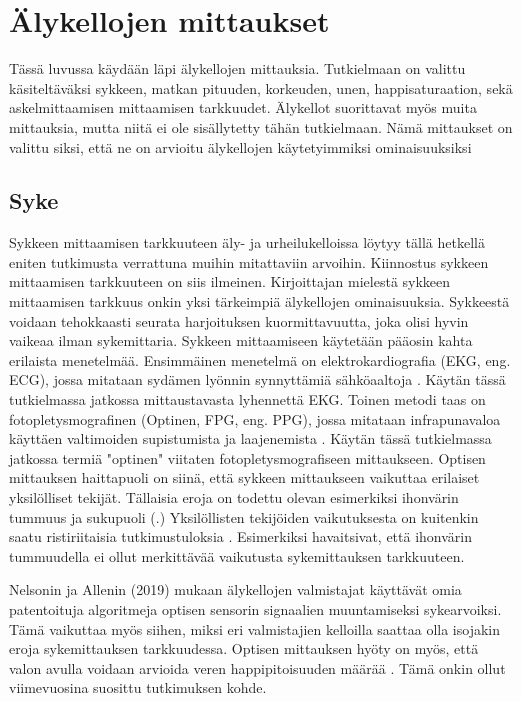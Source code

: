 \documentclass[utf8,bachelor,finnish]{bachelor}
\begin{document}
  \chapter{Älykellojen mittaukset}
  Tässä luvussa käydään läpi älykellojen mittauksia. Tutkielmaan on valittu käsiteltäväksi sykkeen, matkan pituuden, korkeuden, unen, happisaturaation, sekä askelmittaamisen mittaamisen tarkkuudet.
   Älykellot suorittavat myös muita mittauksia, mutta niitä ei ole sisällytetty tähän tutkielmaan. Nämä mittaukset on valittu siksi, että ne on arvioitu
    älykellojen käytetyimmiksi ominaisuuksiksi\\


  \section{Syke}
  Sykkeen mittaamisen tarkkuuteen äly- ja urheilukelloissa löytyy tällä hetkellä eniten tutkimusta verrattuna muihin mitattaviin arvoihin.
   Kiinnostus sykkeen mittaamisen tarkkuuteen on siis ilmeinen. Kirjoittajan mielestä sykkeen mittaamisen tarkkuus onkin yksi tärkeimpiä älykellojen ominaisuuksia.
    Sykkeestä voidaan tehokkaasti seurata harjoituksen kuormittavuutta, joka olisi hyvin vaikeaa ilman sykemittaria.
   Sykkeen mittaamiseen käytetään pääosin kahta erilaista menetelmää. Ensimmäinen menetelmä on elektrokardiografia (EKG, eng. ECG), jossa mitataan sydämen lyönnin
   synnyttämiä sähköaaltoja \parencite{noauthor_heart_nodate}. Käytän tässä tutkielmassa jatkossa mittaustavasta lyhennettä EKG.
    Toinen metodi taas on fotopletysmografinen (Optinen, FPG, eng. PPG), jossa mitataan infrapunavaloa käyttäen valtimoiden supistumista ja laajenemista \parencite{noauthor_heart_nodate}.
      Käytän tässä tutkielmassa jatkossa termiä "optinen" viitaten fotopletysmografiseen
      mittaukseen. Optisen mittauksen haittapuoli on siinä, että sykkeen mittaukseen vaikuttaa erilaiset yksilölliset tekijät.
       Tällaisia eroja on todettu olevan esimerkiksi ihonvärin tummuus ja sukupuoli (\cite{shcherbina_accuracy_2017,hochstadt_continuous_2020}.)
       Yksilöllisten tekijöiden vaikutuksesta on kuitenkin saatu ristiriitaisia tutkimustuloksia \parencite{pasadyn_accuracy_2019}.
        Esimerkiksi \textcite{sanudo_pilot_2019, bent_investigating_2020} havaitsivat, että ihonvärin tummuudella ei ollut merkittävää vaikutusta sykemittauksen tarkkuuteen.
      
      
      Nelsonin ja Allenin (2019) mukaan älykellojen valmistajat käyttävät omia patentoituja algoritmeja optisen sensorin
       signaalien muuntamiseksi sykearvoiksi. Tämä vaikuttaa myös siihen, miksi eri valmistajien kelloilla saattaa olla isojakin eroja
        sykemittauksen tarkkuudessa. Optisen mittauksen hyöty on myös, että valon avulla voidaan arvioida veren happipitoisuuden määrää \parencite{noauthor_heart_nodate}.
         Tämä onkin ollut viimevuosina suosittu tutkimuksen kohde.\\
\end{document}
